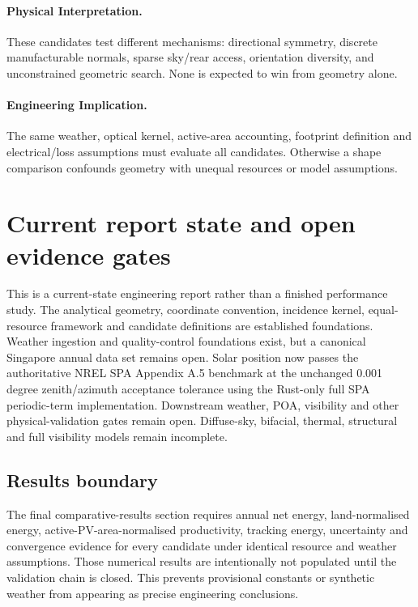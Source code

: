 \documentclass[11pt,a4paper]{article}
\begin{document}
\paragraph{Physical Interpretation.}
These candidates test different mechanisms: directional symmetry, discrete manufacturable normals, sparse sky/rear access, orientation diversity, and unconstrained geometric search. None is expected to win from geometry alone.

\paragraph{Engineering Implication.}
The same weather, optical kernel, active-area accounting, footprint definition and electrical/loss assumptions must evaluate all candidates. Otherwise a shape comparison confounds geometry with unequal resources or model assumptions.


\section{Current report state and open evidence gates}
This is a current-state engineering report rather than a finished performance study. The analytical geometry, coordinate convention, incidence kernel, equal-resource framework and candidate definitions are established foundations. Weather ingestion and quality-control foundations exist, but a canonical Singapore annual data set remains open. Solar position now passes the authoritative NREL SPA Appendix A.5 benchmark at the unchanged 0.001 degree zenith/azimuth acceptance tolerance using the Rust-only full SPA periodic-term implementation. Downstream weather, POA, visibility and other physical-validation gates remain open. Diffuse-sky, bifacial, thermal, structural and full visibility models remain incomplete.

\subsection{Results boundary}
The final comparative-results section requires annual net energy, land-normalised energy, active-PV-area-normalised productivity, tracking energy, uncertainty and convergence evidence for every candidate under identical resource and weather assumptions. Those numerical results are intentionally not populated until the validation chain is closed. This prevents provisional constants or synthetic weather from appearing as precise engineering conclusions.
\end{document}
